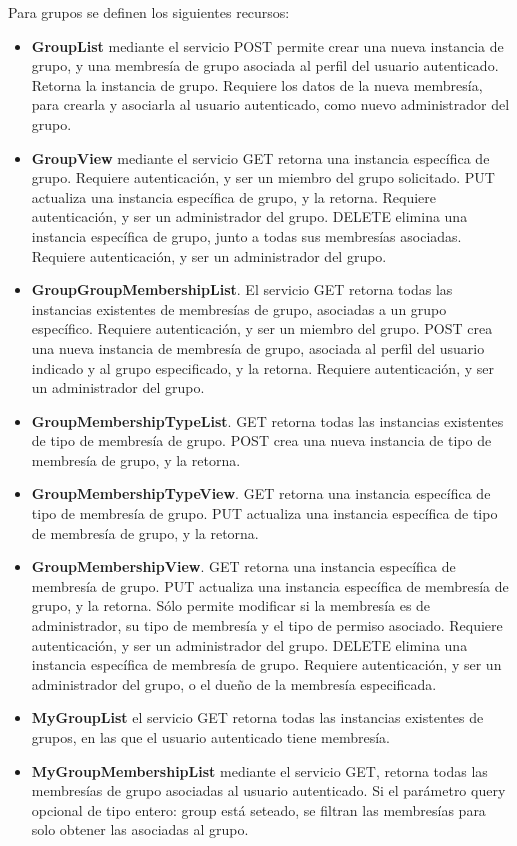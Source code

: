 Para grupos se definen los siguientes recursos:
\begin{itemize}
	\item \textbf{GroupList} mediante el servicio POST permite crear una nueva instancia de grupo, y una membresía de grupo asociada al perfil del usuario autenticado. Retorna la instancia de grupo. Requiere los datos de la nueva membresía, para crearla y asociarla al usuario autenticado, como nuevo administrador del grupo.
	
	\item \textbf{GroupView} mediante el servicio GET retorna una instancia específica de grupo. Requiere autenticación, y ser un miembro del grupo solicitado. PUT actualiza una instancia específica de grupo, y la retorna. Requiere autenticación, y ser un administrador del grupo. DELETE elimina una instancia específica de grupo, junto a todas sus membresías asociadas. Requiere autenticación, y ser un administrador del grupo.
	
	\item \textbf{GroupGroupMembershipList}. El servicio GET retorna todas las instancias existentes de membresías de grupo, asociadas a un grupo específico. Requiere autenticación, y ser un miembro del grupo. POST crea una nueva instancia de membresía de grupo, asociada al perfil del usuario indicado y al grupo especificado, y la retorna. Requiere autenticación, y ser un administrador del grupo.
	
	\item \textbf{GroupMembershipTypeList}. GET retorna todas las instancias existentes de tipo de membresía de grupo. POST crea una nueva instancia de tipo de membresía de grupo, y la retorna.
	
	\item \textbf{GroupMembershipTypeView}. GET retorna una instancia específica de tipo de membresía de grupo. PUT actualiza una instancia específica de tipo de membresía de grupo, y la retorna.
	
	\item \textbf{GroupMembershipView}. GET retorna una instancia específica de membresía de grupo. PUT actualiza una instancia específica de membresía de grupo, y la retorna. Sólo permite modificar si la membresía es de administrador, su tipo de membresía y el tipo de permiso asociado. Requiere autenticación, y ser un administrador del grupo. DELETE elimina una instancia específica de membresía de grupo. Requiere autenticación, y ser un administrador del grupo, o el dueño de la membresía especificada.
	
	\item \textbf{MyGroupList} el servicio GET retorna todas las instancias existentes de grupos, en las que el usuario autenticado tiene membresía.
	
	\item \textbf{MyGroupMembershipList}  mediante el servicio GET, retorna todas las membresías de grupo asociadas al usuario autenticado. Si el parámetro query opcional de tipo entero: group está seteado, se filtran las membresías para solo obtener las asociadas al grupo.
	
\end{itemize}

